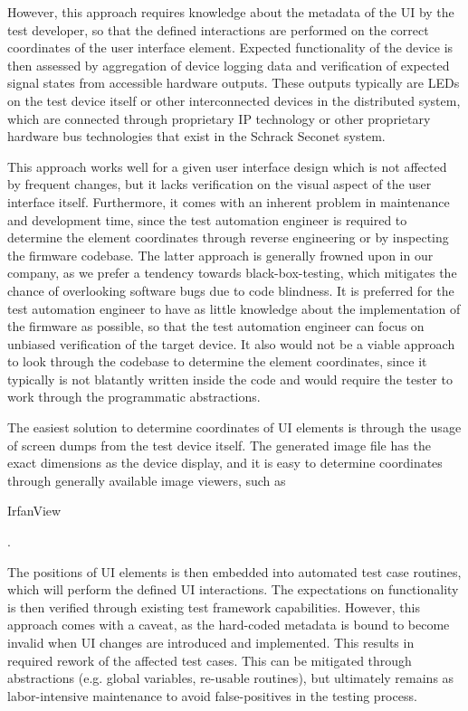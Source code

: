 \documentclass[Proposal,BIC,english,IEEE]{BASE/twbook} %
\begin{document}
However, this approach requires knowledge about the metadata of the UI by the test developer, so that the defined interactions are performed on the correct coordinates of the user interface element. Expected functionality of the device is then assessed by aggregation of device logging data and verification of expected signal states from accessible hardware outputs. These outputs typically are LEDs on the test device itself or other interconnected devices in the distributed system, which are connected through proprietary IP technology or other proprietary hardware bus technologies that exist in the Schrack Seconet system.

This approach works well for a given user interface design which is not affected by frequent changes, but it lacks verification on the visual aspect of the user interface itself. Furthermore, it comes with an inherent problem in maintenance and development time, since the test automation engineer is required to determine the element coordinates through reverse engineering or by inspecting the firmware codebase.
The latter approach is generally frowned upon in our company, as we prefer a tendency towards black-box-testing, which mitigates the chance of overlooking software bugs due to code blindness. It is preferred for the test automation engineer to have as little knowledge about the implementation of the firmware as possible, so that the test automation engineer can focus on unbiased verification of the target device.
It also would not be a viable approach to look through the codebase to determine the element coordinates, since it typically is not blatantly written inside the code and would require the tester to work through the programmatic abstractions.

The easiest solution to determine coordinates of UI elements is through the usage of screen dumps from the test device itself. The generated image file has the exact dimensions as the device display, and it is easy to determine coordinates through generally available image viewers, such as \begin{em}IrfanView\end{em}.

The positions of UI elements is then embedded into automated test case routines, which will perform the defined UI interactions.
The expectations on functionality is then verified through existing test framework capabilities.
However, this approach comes with a caveat, as the hard-coded metadata is bound to become invalid when UI changes are introduced and implemented. This results in required rework of the affected test cases. This can be mitigated through abstractions (e.g. global variables, re-usable routines), but ultimately remains as labor-intensive maintenance to avoid false-positives in the testing process.
\end{document}

